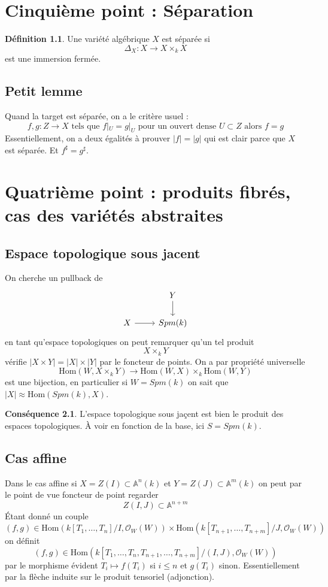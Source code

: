 \documentclass[a4paper,12pt]{book}
\newcommand{\A}{\mathbb{A}}
\newcommand{\Or}{\mathcal{O}}
\newcommand{\Hom}{\textrm{Hom}}
\theoremstyle{plain}
\theoremstyle{definition}
\newtheorem{defn}[subsection]{Définition}
\newtheorem{cons}{Conséquence}
\theoremstyle{remark}
\begin{document}
\chapter{Cinquième point : Séparation}
\begin{defn}
    Une variété algébrique $X$ est séparée si 
    \[\Delta_X\colon X\to X\times_k X\]
    est une immersion fermée.
\end{defn}
\section{Petit lemme}
Quand la target est séparée, on a le critère usuel :
\[f,g\colon Z\to X\textrm{ tels que }f|_U=g|_U\textrm{ pour un ouvert
dense $U\subset Z$ alors $f=g$}\]
Essentiellement, on a deux égalités à prouver $|f|=|g|$ qui est clair
parce que $X$ est séparée. Et $f^\sharp=g^\sharp$.


\chapter{Quatrième point : produits fibrés, cas des variétés abstraites}
\section{Espace topologique sous jacent}
On cherche un pullback de
\[\begin{tikzcd}
	& Y \\
	X & {Spm(k)}
	\arrow[from=1-2, to=2-2]
	\arrow[from=2-1, to=2-2]
\end{tikzcd}\]
en tant qu'espace topologiques on peut remarquer qu'un tel produit
\[X\times_k Y\]
vérifie $|X\times Y|=|X|\times |Y|$ par le foncteur de points. On a 
par propriété universelle
\[\Hom(W, X\times_k Y)\to \Hom(W,X)\times_k\Hom(W,Y)\]
est une bijection, en particulier si $W=Spm(k)$ on sait que 
$|X|\approx \Hom(Spm(k),X)$.

\begin{cons}
    L'espace topologique sous jaçent est bien le produit des espaces
    topologiques. À voir en fonction de la base, ici $S=Spm(k)$.
\end{cons}
\section{Cas affine}
Dans le cas affine si $X=Z(I)\subset \A^n(k)$ et $Y=Z(J)\subset \A^m(k)$
on peut par le point de vue foncteur de point regarder 
\[Z(I,J)\subset \A^{n+m}\]
Étant donné un couple \[(f,g)\in \Hom(k[T_1,\ldots, T_n]/I, \Or_W(W))
\times\Hom(k[T_{n+1},\ldots,T_{n+m}]/J, \Or_W(W))\]
on définit \[(f,g)\in \Hom(k[T_1,\ldots, T_n, T_{n+1},\ldots,T_{n+m}]
/(I,J), \Or_W(W))\]
par le morphisme évident $T_i\mapsto f(T_i)$ si $i\leq n$ et $g(T_i)$
sinon. Essentiellement par la flèche induite sur le produit tensoriel 
(adjonction).
\end{document}
